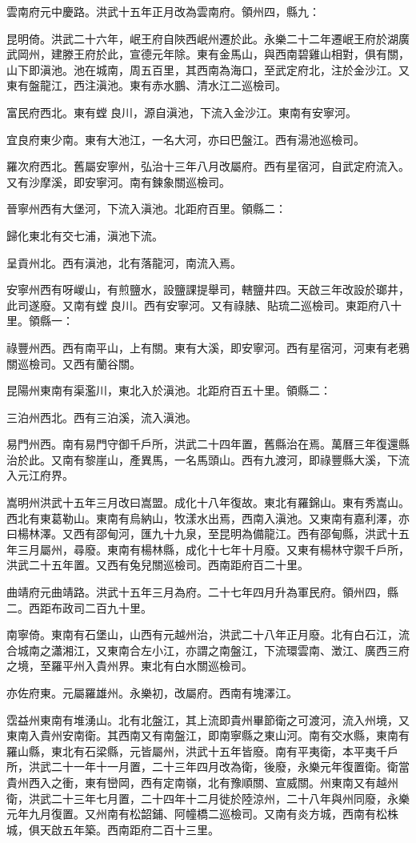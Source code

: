 雲南府元中慶路。洪武十五年正月改為雲南府。領州四，縣九：

昆明倚。洪武二十六年，岷王府自陜西岷州遷於此。永樂二十二年遷岷王府於湖廣武岡州，建滕王府於此，宣德元年除。東有金馬山，與西南碧雞山相對，俱有關，山下即滇池。池在城南，周五百里，其西南為海口，至武定府北，注於金沙江。又東有盤龍江，西注滇池。東有赤水鵬、清水江二巡檢司。

富民府西北。東有螳良川，源自滇池，下流入金沙江。東南有安寧河。

宜良府東少南。東有大池江，一名大河，亦曰巴盤江。西有湯池巡檢司。

羅次府西北。舊屬安寧州，弘治十三年八月改屬府。西有星宿河，自武定府流入。又有沙摩溪，即安寧河。南有鍊象關巡檢司。

晉寧州西有大堡河，下流入滇池。北距府百里。領縣二：

歸化東北有交七浦，滇池下流。

呈貢州北。西有滇池，北有落龍河，南流入焉。

安寧州西有呀嵕山，有煎鹽水，設鹽課提舉司，轄鹽井四。天啟三年改設於瑯井，此司遂廢。又南有螳良川。西有安寧河。又有祿脿、貼琉二巡檢司。東距府八十里。領縣一：

祿豐州西。西有南平山，上有關。東有大溪，即安寧河。西有星宿河，河東有老鴉關巡檢司。又西有蘭谷關。

昆陽州東南有渠濫川，東北入於滇池。北距府百五十里。領縣二：

三泊州西北。西有三泊溪，流入滇池。

易門州西。南有易門守御千戶所，洪武二十四年置，舊縣治在焉。萬曆三年復還縣治於此。又南有黎崖山，產異馬，一名馬頭山。西有九渡河，即祿豐縣大溪，下流入元江府界。

嵩明州洪武十五年三月改曰嵩盟。成化十八年復故。東北有羅錦山。東有秀嵩山。西北有東葛勒山。東南有烏納山，牧漾水出焉，西南入滇池。又東南有嘉利澤，亦曰楊林澤。又西有邵甸河，匯九十九泉，至昆明為備龍江。西有邵甸縣，洪武十五年三月屬州，尋廢。東南有楊林縣，成化十七年十月廢。又東有楊林守禦千戶所，洪武二十五年置。又西有兔兒關巡檢司。西南距府百二十里。

曲靖府元曲靖路。洪武十五年三月為府。二十七年四月升為軍民府。領州四，縣二。西距布政司二百九十里。

南寧倚。東南有石堡山，山西有元越州治，洪武二十八年正月廢。北有白石江，流合城南之瀟湘江，又東南合左小江，亦謂之南盤江，下流環雲南、澂江、廣西三府之境，至羅平州入貴州界。東北有白水關巡檢司。

亦佐府東。元屬羅雄州。永樂初，改屬府。西南有塊澤江。

霑益州東南有堆湧山。北有北盤江，其上流即貴州畢節衛之可渡河，流入州境，又東南入貴州安南衛。其西南又有南盤江，即南寧縣之東山河。南有交水縣，東南有羅山縣，東北有石梁縣，元皆屬州，洪武十五年皆廢。南有平夷衛，本平夷千戶所，洪武二十一年十一月置，二十三年四月改為衛，後廢，永樂元年復置衛。衛當貴州西入之衝，東有巒岡，西有定南嶺，北有豫順關、宣威關。州東南又有越州衛，洪武二十三年七月置，二十四年十二月徙於陸涼州，二十八年與州同廢，永樂元年九月復置。又州南有松韶鋪、阿幢橋二巡檢司。又南有炎方城，西南有松株城，俱天啟五年築。西南距府二百十三里。

